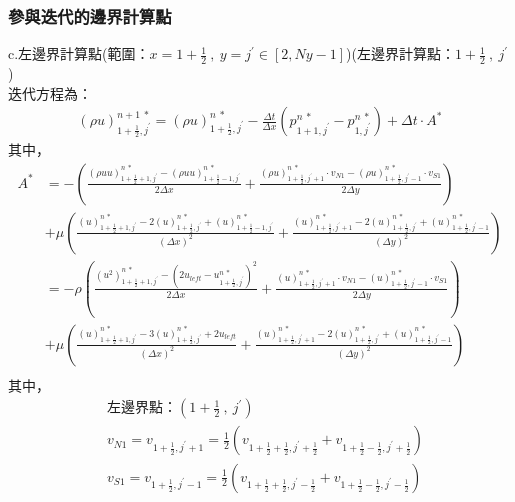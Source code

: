 \documentclass[12pt]{article}
\begin{document}
\subsubsection{參與迭代的邊界計算點}
\noindent c.左邊界計算點(範圍：$x = 1+\frac{1}{2}\ ,\  y = j^{\prime} \in [2,Ny-1]$)(左邊界計算點：$1+\frac{1}{2}\ ,\ j^{\prime}$)\\[1.5ex]
\noindent 迭代方程為：
\begin{equation}\begin{split}
    (\rho u)_{1+\frac{1}{2},j^{\prime}}^{n+1\ *} = (\rho u)_{1+\frac{1}{2},j^{\prime}}^{n\ *} - \frac{\Delta t}{\Delta x}(p_{1+1,j^{\prime}}^{n\ *} - p_{1,j^{\prime}}^{n\ *}) + \Delta t\cdot A^{*}
\end{split}\end{equation}
\noindent 其中，
\begin{equation*}\begin{split}
    A^{*} 
    &= -\left(\frac{(\rho u u )_{1+\frac{1}{2}+1,j^{\prime}}^{n\ *} - (\rho u u)_{1+\frac{1}{2} - 1,j^{\prime}}^{n\ *}}{2\Delta x} + \frac{(\rho u)_{1+\frac{1}{2},j^{\prime}+1}^{n\ *}\cdot v_{N1}- (\rho u)_{1+\frac{1}{2},j^{\prime}-1}^{n\ *}\cdot v_{S1}}{2\Delta y}\right)\\[1.5ex]
    &+\mu\left(\frac{(u)_{1+\frac{1}{2}+1,j^{\prime}}^{n\ *}-2(u)_{1+\frac{1}{2},j^{\prime}}^{n\ *}+(u)_{1+\frac{1}{2}-1,j^{\prime}}^{n\ *}}{(\Delta x)^{2}}+\frac{(u)_{1+\frac{1}{2},j^{\prime}+1}^{n\ *}-2(u)_{1+\frac{1}{2},j^{\prime}}^{n\ *}+(u)_{1+\frac{1}{2},j^{\prime}-1}^{n\ *}}{(\Delta y)^{2}}\right)\\[1.5ex]
    &= -\rho \left(\frac{(u^{2} )_{1+\frac{1}{2}+1,j^{\prime}}^{n\ *} -(2u_{left} - u_{1+\frac{1}{2},j^{\prime}}^{n\ *})^{2}}{2\Delta x} + \frac{(u)_{1+\frac{1}{2},j^{\prime}+1}^{n\ *}\cdot v_{N1}- (u)_{1+\frac{1}{2},j^{\prime}-1}^{n\ *}\cdot v_{S1}}{2\Delta y}\right)\\[1.5ex]
    &+\mu\left(\frac{(u)_{1+\frac{1}{2}+1,j^{\prime}}^{n\ *}-3(u)_{1+\frac{1}{2},j^{\prime}}^{n\ *}+2u_{left}}{(\Delta x)^{2}}+\frac{(u)_{1+\frac{1}{2},j^{\prime}+1}^{n\ *}-2(u)_{1+\frac{1}{2},j^{\prime}}^{n\ *}+(u)_{1+\frac{1}{2},j^{\prime}-1}^{n\ *}}{(\Delta y)^{2}}\right)\\[1.5ex]
\end{split}\end{equation*}
\noindent 其中，
\begin{equation*}\begin{split}
    &\text{左邊界點：}(1+\frac{1}{2}\ ,\ j^{\prime})\\[1.5ex]
    &v_{N1} = v_{1+\frac{1}{2},j^{\prime}+1} = \frac{1}{2}(v_{1+\frac{1}{2}+\frac{1}{2},j^{\prime}+\frac{1}{2}} + v_{1+\frac{1}{2}-\frac{1}{2},j^{\prime}+\frac{1}{2}})\\[1.5ex]
    &v_{S1} = v_{1+\frac{1}{2},j^{\prime}-1} = \frac{1}{2}(v_{1+\frac{1}{2}+\frac{1}{2},j^{\prime}-\frac{1}{2}} + v_{1+\frac{1}{2}-\frac{1}{2},j^{\prime}-\frac{1}{2}})\\[1.5ex]
\end{split}\end{equation*}
\end{document}
